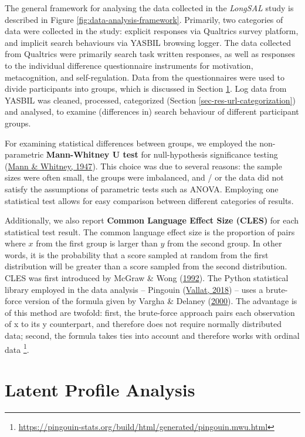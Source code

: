 \documentclass[letterpaper, nobind]{templates/ociamthesis}
\begin{document}
The general framework for analysing the data collected in the \emph{LongSAL} study is described in Figure \ref{fig:data-analysis-framework}.
Primarily, two categories of data were collected in the study:
explicit responses via Qualtrics survey platform, and implicit search behaviours via YASBIL browsing logger.
The data collected from Qualtrics were primarily search task written responses, as well as responses to the individual difference questionnaire instruments for motivation, metacognition, and self-regulation.
Data from the questionnaires were used to divide participants into groups, which is discussed in Section \ref{sec-res-phase2-lpa}.
Log data from YASBIL was cleaned, processed, categorized (Section \ref{sec-res-url-categorization}) and analysed, to examine (differences in) search behaviour of different participant groups.

For examining statistical differences between groups, we employed the non-parametric \textbf{Mann-Whitney U test} for null-hypothesis significance testing (\protect\hyperlink{ref-mann1947test}{Mann \& Whitney, 1947}).
This choice was due to several reasons:
the sample sizes were often small,
the groups were imbalanced, and / or the data did not satisfy the assumptions of parametric tests such as ANOVA.
Employing one statistical test allows for easy comparison between different categories of results.

Additionally, we also report \textbf{Common Language Effect Size (CLES)} for each statistical test result.
The common language effect size is the proportion of pairs where \(x\) from the first group is larger than \(y\) from the second group.
In other words, it is the probability that a score sampled at random from the first distribution will be greater than a score sampled from the second distribution.
CLES was first introduced by McGraw \& Wong (\protect\hyperlink{ref-mcgraw1992common}{1992}).
The Python statistical library employed in the data analysis -- Pingouin (\protect\hyperlink{ref-vallat2018pingouin}{Vallat, 2018}) -- uses a brute-force version of the formula given by Vargha \& Delaney (\protect\hyperlink{ref-vargha2000critique}{2000}).
The advantage is of this method are twofold:
first, the brute-force approach pairs each observation of x to its y counterpart, and therefore does not require normally distributed data;
second, the formula takes ties into account and therefore works with ordinal data \footnote{\url{https://pingouin-stats.org/build/html/generated/pingouin.mwu.html}}.

\hypertarget{sec-res-phase2-lpa}{%
\section{Latent Profile Analysis}\label{sec-res-phase2-lpa}}
\end{document}
